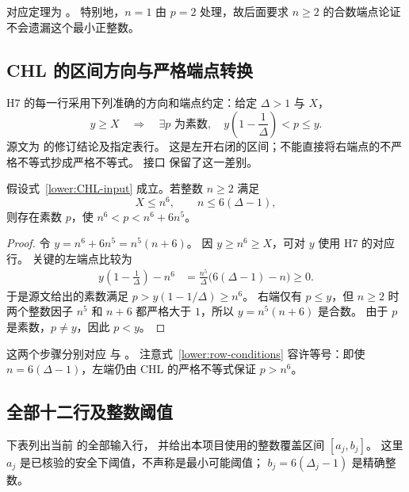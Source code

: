对应定理为 。
特别地，$n=1$ 由 $p=2$ 处理，故后面要求 $n\geq2$ 的合数端点论证
不会遗漏这个最小正整数。

\subsection{CHL 的区间方向与严格端点转换}

H7 的每一行采用下列准确的方向和端点约定：给定 $\Delta>1$ 与 $X$，
\begin{equation}\label{lower:CHL-input}
 y\geq X\quad\Longrightarrow\quad
 \exists p\text{ 为素数},\quad
 y\left(1-\frac1\Delta\right)<p\leq y.
\end{equation}
源文为 \cite{CHL,CHLcorr} 的修订结论及指定表行。
这是左开右闭的区间；不能直接将右端点的不严格不等式抄成严格不等式。
接口  保留了这一差别。

\begin{lemma}\label{lower:CHL-conversion}
假设式~\eqref{lower:CHL-input} 成立。若整数 $n\geq2$ 满足
\begin{equation}\label{lower:row-conditions}
 X\leq n^6,\qquad n\leq6(\Delta-1),
\end{equation}
则存在素数 $p$，使 $n^6<p<n^6+6n^5$。
\end{lemma}

\begin{proof}
令 $y=n^6+6n^5=n^5(n+6)$。
因 $y\geq n^6\geq X$，可对 $y$ 使用 H7 的对应行。
关键的左端点比较为
\begin{align}
 y\left(1-\frac1\Delta\right)-n^6
 &=\frac{n^5}{\Delta}\bigl(6(\Delta-1)-n\bigr)\geq0.
 \label{lower:left-comparison}
\end{align}
于是源文给出的素数满足
$p>y(1-1/\Delta)\geq n^6$。
右端仅有 $p\leq y$，但 $n\geq2$ 时两个整数因子
$n^5$ 和 $n+6$ 都严格大于 $1$，所以 $y=n^5(n+6)$ 是合数。
由于 $p$ 是素数，$p\ne y$，因此 $p<y$。
\end{proof}

这两个步骤分别对应
 与
。
注意式~\eqref{lower:row-conditions} 容许等号：即使
$n=6(\Delta-1)$，左端仍由 CHL 的严格不等式保证 $p>n^6$。

\subsection{全部十二行及整数阈值}

下表列出当前  的全部输入行，
并给出本项目使用的整数覆盖区间 $[a_j,b_j]$。
这里 $a_j$ 是已核验的安全下阈值，不声称是最小可能阈值；
$b_j=6(\Delta_j-1)$ 是精确整数。

